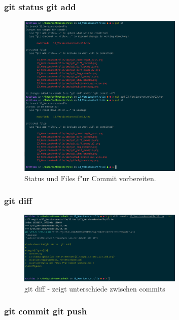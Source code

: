 \documentclass[12pt]{article}
\begin{document}
\subsubsection{git status  git add}

\begin{figure}[H]
  \centering
  \includegraphics[width=0.7\textwidth]{./img/git_status_git_add.png}
  \captionsetup{name=Abb.,font=footnotesize}
  \caption{Status und Files f"ur Commit vorbereiten.}
\end{figure}

\subsubsection{git diff}

\begin{figure}[H]
  \centering
  \includegraphics[width=0.7\textwidth]{./img/git_diff.png}
  \captionsetup{name=Abb.,font=footnotesize}
  \caption{git diff - zeigt unterschiede zwischen commits}
\end{figure}

\subsubsection{git commit git push}
\end{document}
